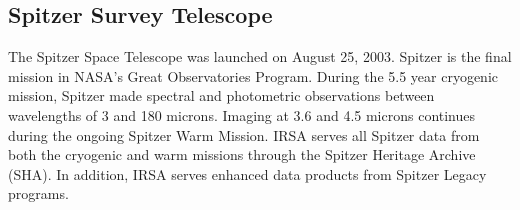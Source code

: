 \documentclass[fleqn,a4paper,12pt,oneside]{article}
\begin{document}
\subsection{Spitzer Survey Telescope}
The Spitzer Space Telescope was launched on August 25, 2003. Spitzer is the final mission in NASA's Great Observatories Program. During the 5.5 year cryogenic mission, Spitzer made spectral and photometric observations between wavelengths of 3 and 180 microns. Imaging at 3.6 and 4.5 microns continues during the ongoing Spitzer Warm Mission. IRSA serves all Spitzer data from both the cryogenic and warm missions through the Spitzer Heritage Archive (SHA). In addition, IRSA serves enhanced data products from Spitzer Legacy programs.   

\end{document}
